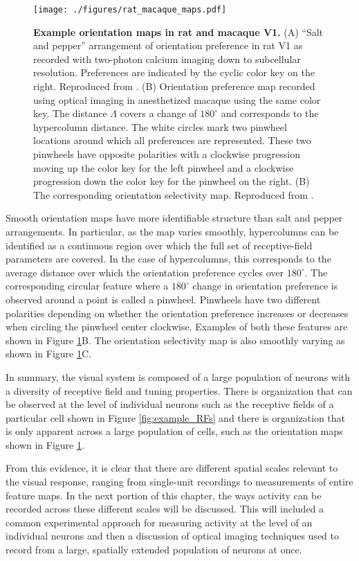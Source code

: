 \documentclass[phd,ianc,twoside]{infthesis}
\begin{document}
\begin{figure}
\center
\texttt{[image: ./figures/rat\_macaque\_maps.pdf]}
\caption{{\bf Example orientation maps in rat and macaque V1.}  (A)
  ``Salt and pepper'' arrangement of orientation preference in rat V1 as
  recorded with two-photon calcium imaging down to subcellular
  resolution. Preferences are indicated by the cyclic color key on the
  right. Reproduced from \citet{ohki_nature05}. (B) Orientation preference
  map recorded using optical imaging in anesthetized macaque using the
  same color key. The distance $\Lambda$ covers a change of $180^\circ$
  and corresponds to the hypercolumn distance. The white circles mark
  two pinwheel locations around which all preferences are
  represented. These two pinwheels have opposite polarities with a
  clockwise progression moving up the color key for the left pinwheel
  and a clockwise progression down the color key for the pinwheel on the
  right. (B) The corresponding orientation selectivity map. Reproduced
  from \citet{blasdel_jn92b}.}
\label{fig:example_OR_maps}
\end{figure}


Smooth orientation maps have more identifiable structure than salt and
pepper arrangements. In particular, as the map varies smoothly,
hypercolumns can be identified as a continuous region over which the
full set of receptive-field parameters are covered. In the case of
hypercolumns, this corresponds to the average distance over which the
orientation preference cycles over $180^\circ$. The corresponding
circular feature where a $180^\circ$ change in orientation preference is
observed around a point is called a pinwheel. Pinwheels have two
different polarities depending on whether the orientation preference
increases or decreases when circling the pinwheel center
clockwise. Examples of both these features are shown in Figure
\ref{fig:example_OR_maps}B. The orientation selectivity map is also
smoothly varying as shown in Figure \ref{fig:example_OR_maps}C.

In summary, the visual system is composed of a large population of
neurons with a diversity of receptive field and tuning properties. There
is organization that can be observed at the level of individual neurons
such as the receptive fields of a particular cell shown in Figure
\ref{fig:example_RFs} and there is organization that is only apparent
across a large population of cells, such as the orientation maps shown
in Figure \ref{fig:example_OR_maps}.

From this evidence, it is clear that there are different spatial scales relevant
to the visual response, ranging from single-unit recordings to
measurements of entire feature maps. In the next portion of this
chapter, the ways activity can be recorded across these different scales
will be discussed. This will included a common experimental approach for
measuring activity at the level of an individual neurons and then a
discussion of optical imaging techniques used to record from a large,
spatially extended population of neurons at once.
\end{document}
